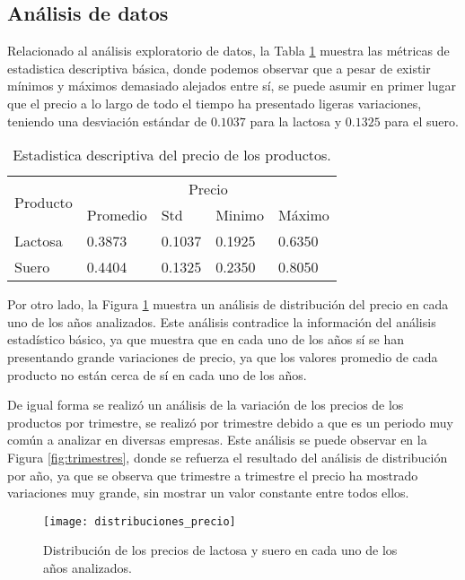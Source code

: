 \subsection{Análisis de datos}
Relacionado al análisis exploratorio de datos, la Tabla \ref{tab:describe} muestra las métricas de estadistica descriptiva básica, donde podemos observar que a pesar de existir mínimos y máximos demasiado alejados entre sí, se puede asumir en primer lugar que el precio a lo largo de todo el tiempo ha presentado ligeras variaciones, teniendo una desviación estándar de $0.1037$ para la lactosa y $0.1325$ para el suero.

\begin{table}[htbp]
\centering
\caption{Estadistica descriptiva del precio de los productos.}
\begin{tabular}{lllll}
\hline
\multirow{2}{*}{Producto} & \multicolumn{4}{c}{Precio}          \\ \cline{2-5} 
                          & Promedio & Std    & Minimo & Máximo \\ \hline
Lactosa                   & 0.3873   & 0.1037 & 0.1925 & 0.6350 \\
Suero                     & 0.4404   & 0.1325 & 0.2350 & 0.8050 \\ \hline
\end{tabular}
\label{tab:describe}
\end{table}

Por otro lado, la Figura \ref{fig:distribuciones} muestra un análisis de distribución del precio en cada uno de los años analizados. Este análisis contradice la información del análisis estadístico básico, ya que muestra que en cada uno de los años sí se han presentando grande variaciones de precio, ya que los valores promedio de cada producto no están cerca de sí en cada uno de los años.

De igual forma se realizó un análisis de la variación de los precios de los productos por trimestre, se realizó por trimestre debido a que es un periodo muy común a analizar en diversas empresas. Este análisis se puede observar en la Figura \ref{fig:trimestres}, donde se refuerza el resultado del análisis de distribución por año, ya que se observa que trimestre a trimestre el precio ha mostrado variaciones muy grande, sin mostrar un valor constante entre todos ellos.

\begin{figure}[htbp]
\centering
\texttt{[image: distribuciones\_precio]}
\caption{Distribución de los precios de lactosa y suero en cada uno de los años analizados.}
\label{fig:distribuciones}
\end{figure}


